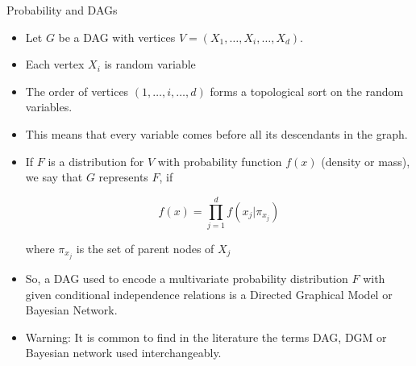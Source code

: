 \documentclass[handout]{beamer}
\begin{document}
\begin{frame}{Probability and DAGs}
\scriptsize{
\begin{itemize}






\item Let $G$ be a DAG with vertices $V = (X_1 , \dots , X_i, \dots, X_d )$. 
\item Each vertex $X_i$ is random variable
\item The order of vertices $(1,\dots,i,\dots,d)$ forms a topological sort on the random variables.

\item This means that every variable comes before all its descendants in the graph.

\item If $F$ is a distribution for $V$ with probability function $f(x)$ (density or mass), we say that $G$ represents $F$, if

\begin{displaymath}
 f(x) = \prod_{j=1}^d f(x_j| \pi_{x_j})
\end{displaymath}

where $\pi_{x_j}$ is the set of parent nodes of $X_j$

\item So, a DAG used to encode a multivariate probability distribution $F$ with given conditional independence relations is a Directed Graphical Model or Bayesian Network.

\item Warning: It is common to find in the literature the terms DAG, DGM or Bayesian network used interchangeably. 

\end{itemize}



} 

\end{frame}
\end{document}
